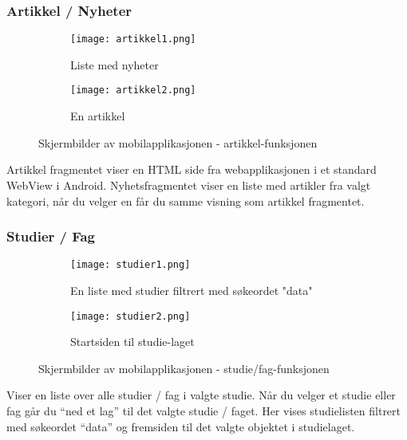 \documentclass[../main.tex]{subfiles}
\begin{document}
\subsubsection{Artikkel / Nyheter}

\begin{figure}[H]
        \centering
        \begin{subfigure}[b]{0.4\textwidth}
                \centering
                \texttt{[image: artikkel1.png]}
                \caption{Liste med nyheter}
        \end{subfigure}
        \quad
        \begin{subfigure}[b]{0.4\textwidth}
                \centering
                \texttt{[image: artikkel2.png]}
                \caption{En artikkel}
        \end{subfigure}
        \caption{Skjermbilder av mobilapplikasjonen - artikkel-funksjonen}
\end{figure}

Artikkel fragmentet viser en HTML side fra webapplikasjonen i et standard WebView i Android. Nyhetsfragmentet viser en liste med artikler fra valgt kategori, når du velger en får du samme visning som artikkel fragmentet.

\subsubsection{Studier / Fag}

\begin{figure}[H]
        \centering
        \begin{subfigure}[b]{0.4\textwidth}
                \centering
                \texttt{[image: studier1.png]}
                \caption{En liste med studier filtrert med søkeordet "data"}
        \end{subfigure}
        \quad
        \begin{subfigure}[b]{0.4\textwidth}
                \centering
                \texttt{[image: studier2.png]}
                \caption{Startsiden til studie-laget}
        \end{subfigure}
        \caption{Skjermbilder av mobilapplikasjonen -  studie/fag-funksjonen}
\end{figure}

Viser en liste over alle studier / fag i valgte studie. Når du velger et studie eller fag går du “ned et lag” til det valgte studie / faget. Her vises studielisten filtrert med søkeordet “data” og fremsiden til det valgte objektet i studielaget.
\end{document}
